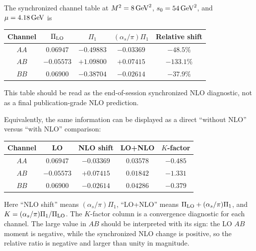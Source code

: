 \documentclass[11pt]{article}
\newcommand{\as}{\alpha_s}
\begin{document}
The synchronized channel table at
\(M^2=8\,{\rm GeV}^2\), \(s_0=54\,{\rm GeV}^2\), and
\(\mu=4.18\,{\rm GeV}\) is
\begin{center}
\begin{tabular}{ccccc}
\toprule
Channel & \(\Pi_{\rm LO}\) & \(\Pi_1\) &
\((\as/\pi)\Pi_1\) & Relative shift\\
\midrule
\(AA\) & \(0.06947\) & \(-0.49883\) & \(-0.03369\) & \(-48.5\%\)\\
\(AB\) & \(-0.05573\) & \(+1.09800\) & \(+0.07415\) & \(-133.1\%\)\\
\(BB\) & \(0.06900\) & \(-0.38704\) & \(-0.02614\) & \(-37.9\%\)\\
\bottomrule
\end{tabular}
\end{center}
This table should be read as the end-of-session synchronized NLO diagnostic,
not as a final publication-grade NLO prediction.

Equivalently, the same information can be displayed as a direct
``without NLO'' versus ``with NLO'' comparison:
\begin{center}
\begin{tabular}{ccccc}
\toprule
Channel & LO & NLO shift & LO+NLO & \(K\)-factor\\
\midrule
\(AA\) & \(0.06947\) & \(-0.03369\) & \(0.03578\) & \(-0.485\)\\
\(AB\) & \(-0.05573\) & \(+0.07415\) & \(0.01842\) & \(-1.331\)\\
\(BB\) & \(0.06900\) & \(-0.02614\) & \(0.04286\) & \(-0.379\)\\
\bottomrule
\end{tabular}
\end{center}

Here ``NLO shift'' means \((\as/\pi)\Pi_1\), ``LO+NLO'' means
\(\Pi_{\rm LO}+(\as/\pi)\Pi_1\), and
\(K=(\as/\pi)\Pi_1/\Pi_{\rm LO}\).  The \(K\)-factor column is a
convergence diagnostic for each channel.  The
large value in \(AB\) should be interpreted with its sign: the LO \(AB\)
moment is negative, while the synchronized NLO change is positive, so the
relative ratio is negative and larger than unity in magnitude.
\end{document}

